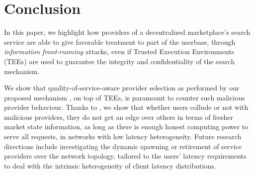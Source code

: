 \section{Conclusion}\label{sec:conclusion}

In this paper, we highlight how providers of a decentralized marketplace's search service are able to give favorable treatment to part of the userbase, through \emph{information front-running} attacks, even if Trusted Execution Environments (TEEs) are used to guarantee the integrity and confidentiality of the search mechanism.

We show that quality-of-service-aware provider selection as performed by our proposed mechanism \sysname, on top of TEEs, is paramount to counter such malicious provider behaviour. 
Thanks to \sysname, we show that whether users collude or not with malicious providers, they do not get an edge over others in terms of fresher market state information, as long as there is enough honest computing power to serve all requests, in networks with low latency heterogeneity.
Future research directions include investigating the dynamic spawning or retirement of service providers over the network topology, tailored to the users' latency requirements to deal with the intrinsic heterogeneity of client latency distributions.
